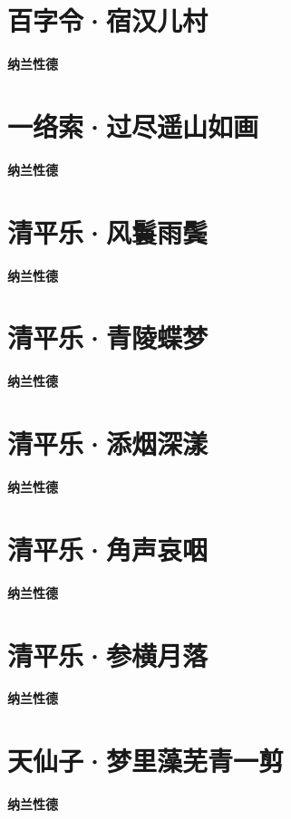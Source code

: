 \documentclass[12pt,a4paper]{ctexbook}
\begin{document}
\section{百字令·宿汉儿村}
\textbf{纳兰性德}\par\vspace{0.5em}

\section{一络索·过尽遥山如画}
\textbf{纳兰性德}\par\vspace{0.5em}

\section{清平乐·风鬟雨鬓}
\textbf{纳兰性德}\par\vspace{0.5em}

\section{清平乐·青陵蝶梦}
\textbf{纳兰性德}\par\vspace{0.5em}

\section{清平乐·添烟深漾}
\textbf{纳兰性德}\par\vspace{0.5em}

\section{清平乐·角声哀咽}
\textbf{纳兰性德}\par\vspace{0.5em}

\section{清平乐·参横月落}
\textbf{纳兰性德}\par\vspace{0.5em}

\section{天仙子·梦里藻芜青一剪}
\textbf{纳兰性德}\par\vspace{0.5em}
\end{document}
